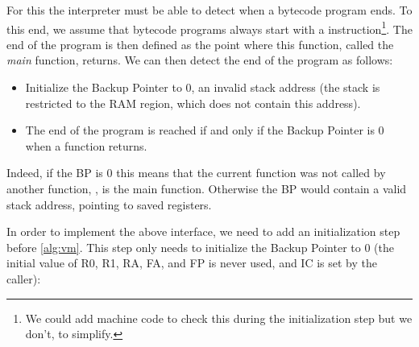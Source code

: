 For this the interpreter must be able to detect when a bytecode program ends.
To this end, we assume that bytecode programs always start with a 
instruction\footnote{We could add machine code to check this during the
initialization step but we don't, to simplify.}. The end of the program is then
defined as the point where this function, called the {\em main} function,
returns. We can then detect the end of the program as follows:
\begin{itemize}
  \item Initialize the Backup Pointer to 0, an invalid stack address (the stack
  is restricted to the RAM region, which does not contain this address).

  \item The end of the program is reached if and only if the Backup Pointer is
  0 when a function returns.
\end{itemize}
Indeed, if the BP is 0 this means that the current function was not called by
another function, \ie, is the main function. Otherwise the BP would contain a
valid stack address, pointing to saved registers.

In order to implement the above interface, we need to add an initialization
step before \cref{alg:vm}. This step only needs to initialize the Backup
Pointer to 0 (the initial value of R0, R1, RA, FA, and FP is never used, and
IC is set by the caller):

